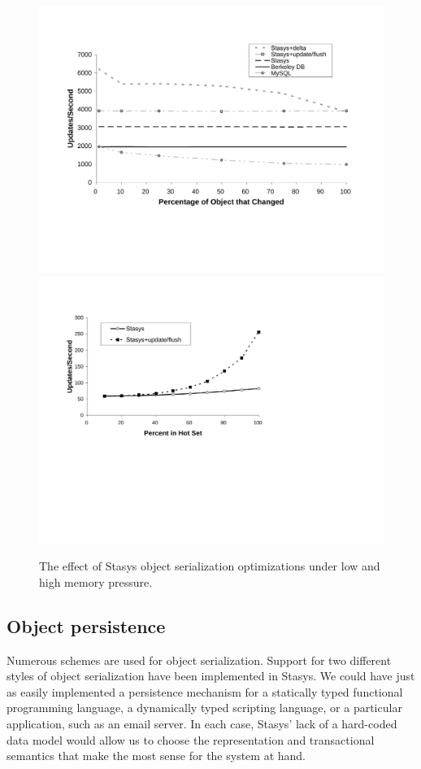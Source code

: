 \documentclass[letterpaper,twocolumn,10pt]{article}
\newcommand{\yad}{Stasys\xspace}
\newcommand{\yads}{Stasys'\xspace}
\begin{document}
\begin{figure}
\includegraphics[width=1\columnwidth]{figs/object-diff.pdf}
\hspace{.2in}
\includegraphics[width=1\columnwidth]{figs/mem-pressure.pdf}
\vspace{-.15in}
\caption{\sf \label{fig:OASYS}
The effect of \yad object serialization optimizations under low and high memory pressure.}
\end{figure}

\subsection{Object persistence}
\label{sec:oasys}
Numerous schemes are used for object serialization.  Support for two
different styles of object serialization have been implemented in
\yad.  We could have just as easily implemented a persistence
mechanism for a statically typed functional programming language, a
dynamically typed scripting language, or a particular application,
such as an email server.  In each case, \yads lack of a hard-coded data
model would allow us to choose the representation and transactional
semantics that make the most sense for the system at hand.
\end{document}
